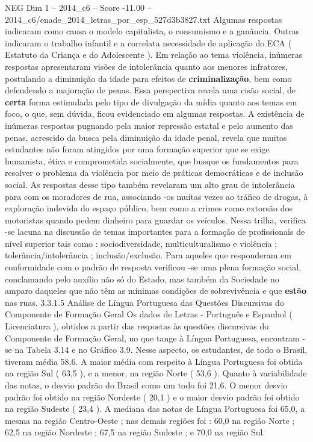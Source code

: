 \begin{textsample}{NEG Dim 1 – 2014\_c6 – Score -11.00 – 2014\_c6/enade\_2014\_letras\_por\_esp\_527d3b3827.txt}
Algumas respostas indicaram como causa o modelo capitalista, o consumismo e a ganância.
Outras indicaram o trabalho infantil e a correlata necessidade de aplicação do ECA ( Estatuto da Criança e do Adolescente ).
Em relação ao tema violência, inúmeras respostas apresentaram visões de intolerância quanto aos menores infratores, postulando a diminuição da idade para efeitos de \textbf{criminalização}, bem como defendendo a majoração de penas.
Essa perspectiva revela uma cisão social, de \textbf{certa} forma estimulada pelo tipo de divulgação da mídia quanto aos temas em foco, o que, sem dúvida, ficou evidenciado em algumas respostas.
A existência de inúmeras respostas pugnando pela maior repressão estatal e pelo aumento das penas, acrescido da busca pela diminuição da idade penal, revela que muitos estudantes não foram atingidos por uma formação superior que se exige humanista, ética e comprometida socialmente, que busque os fundamentos para resolver o problema da violência por meio de práticas democráticas e de inclusão social.
As respostas desse tipo também revelaram um alto grau de intolerância para com os moradores de rua, associando -os muitas vezes ao tráfico de drogas, à exploração indevida do espaço público, bem como a crimes como extorsão dos motoristas quando pedem dinheiro para guardar os veículos.
Nessa trilha, verifica -se lacuna na discussão de temas importantes para a formação de profissionais de nível superior tais como : sociodiversidade, multiculturalismo e violência ; tolerância/intolerância ; inclusão/exclusão.
Para aqueles que responderam em conformidade com o padrão de resposta verificou -se uma plena formação social, conclamando pelo auxílio não só do Estado, mas também da Sociedade no amparo daqueles que não têm as mínimas condições de sobrevivência e que \textbf{estão} nas ruas. 3.3.1.5 Análise de Língua Portuguesa das Questões Discursivas do Componente de Formação Geral Os dados de Letras - Português e Espanhol ( Licenciatura ), obtidos a partir das respostas às questões discursivas do Componente de Formação Geral, no que tange à Língua Portuguesa, encontram -se na Tabela 3.14 e no Gráfico 3.9.
Nesse aspecto, os estudantes, de todo o Brasil, tiveram média 58,6.
A maior média com respeito à Língua Portuguesa foi obtida na região Sul ( 63,5 ), e a menor, na região Norte ( 53,6 ).
Quanto à variabilidade das notas, o desvio padrão do Brasil como um todo foi 21,6.
O menor desvio padrão foi obtido na região Nordeste ( 20,1 ) e o maior desvio padrão foi obtido na região Sudeste ( 23,4 ).
A mediana das notas de Língua Portuguesa foi 65,0, a mesma na região Centro-Oeste ; nas demais regiões foi : 60,0 na região Norte ; 62,5 na região Nordeste ; 67,5 na região Sudeste ; e 70,0 na região Sul.

\end{textsample}
